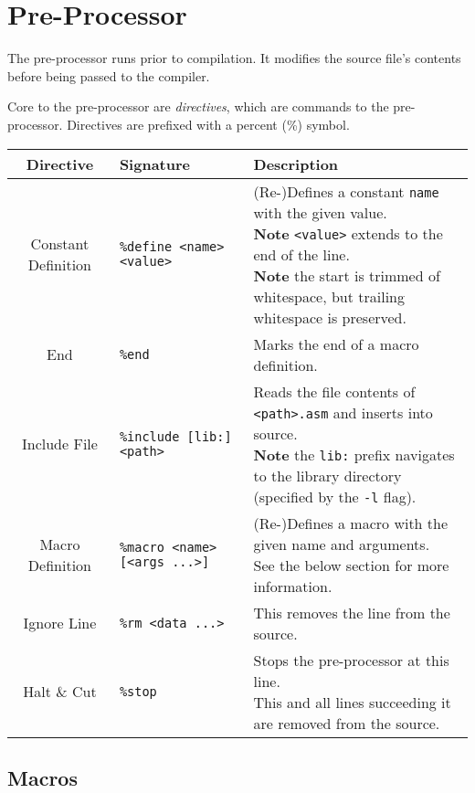 \documentclass[10pt]{article}
\begin{document}
\section{Pre-Processor}

The pre-processor runs prior to compilation.
It modifies the source file's contents before being passed to the compiler.

Core to the pre-processor are \textit{directives}, which are commands to the pre-processor.
Directives are prefixed with a percent (\%) symbol.
\newpage
\medskip
\begin{longtable}{|c|l|l|}
    \hline
    \textbf{Directive} & \textbf{Signature} & \textbf{Description} \\
    \hline
    Constant Definition & \texttt{\%define <name> <value>} & \makecell[l]{(Re-)Defines a constant \texttt{name} with the given value.\\%
    \textbf{Note} \texttt{<value>} extends to the end of the line.\\%
    \textbf{Note} the start is trimmed of whitespace, but trailing\\%
    whitespace is preserved.} \\
    \hline
    End & \texttt{\%end} & Marks the end of a macro definition. \\
    \hline
    Include File & \texttt{\%include [lib:]<path>} & \makecell[l]{Reads the file contents of \texttt{<path>.asm} and inserts into source.\\%
    \textbf{Note} the \texttt{lib:} prefix navigates to the library directory\\(specified by the \texttt{-l} flag).} \\
    \hline
    Macro Definition & \texttt{\%macro <name> [<args ...>]} & \makecell[l]{(Re-)Defines a macro with the given name and arguments.\\%
    See the below section for more information.} \\
    \hline
    Ignore Line & \texttt{\%rm <data ...>} & This removes the line from the source. \\
    \hline
    Halt \& Cut & \texttt{\%stop} & \makecell[l]{Stops the pre-processor at this line.\\%
    This and all lines succeeding it are removed from the source.} \\
    \hline
\end{longtable}

\subsection{Macros}
\end{document}
